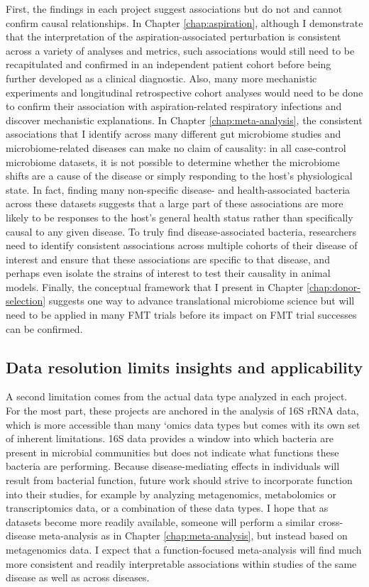 First, the findings in each project suggest associations but do not and cannot confirm causal relationships.
In Chapter \ref{chap:aspiration}, although I demonstrate that the interpretation of the aspiration-associated perturbation is consistent across a variety of analyses and metrics, such associations would still need to be recapitulated and confirmed in an independent patient cohort before being further developed as a clinical diagnostic.
Also, many more mechanistic experiments and longitudinal retrospective cohort analyses would need to be done to confirm their association with aspiration-related respiratory infections and discover mechanistic explanations.
In Chapter \ref{chap:meta-analysis}, the consistent associations that I identify across many different gut microbiome studies and microbiome-related diseases can make no claim of causality: in all case-control microbiome datasets, it is not possible to determine whether the microbiome shifts are a cause of the disease or simply responding to the host's physiological state.
In fact, finding many non-specific disease- and health-associated bacteria across these datasets suggests that a large part of these associations are more likely to be responses to the host's general health status rather than specifically causal to any given disease.
To truly find disease-associated bacteria, researchers need to identify consistent associations across multiple cohorts of their disease of interest and ensure that these associations are specific to that disease, and perhaps even isolate the strains of interest to test their causality in animal models.
Finally, the conceptual framework that I present in Chapter \ref{chap:donor-selection} suggests one way to advance translational microbiome science but will need to be applied in many FMT trials before its impact on FMT trial successes can be confirmed.

\subsection{Data resolution limits insights and applicability}

A second limitation comes from the actual data type analyzed in each project.
For the most part, these projects are anchored in the analysis of 16S rRNA data, which is more accessible than many `omics data types but comes with its own set of inherent limitations.
16S data provides a window into which bacteria are present in microbial communities but does not indicate what functions these bacteria are performing.
Because disease-mediating effects in individuals will result from bacterial function, future work should strive to incorporate function into their studies, for example by analyzing metagenomics, metabolomics or transcriptomics data, or a combination of these data types.
I hope that as datasets become more readily available,  someone will perform a similar cross-disease meta-analysis as in Chapter \ref{chap:meta-analysis}, but instead based on metagenomics data.
I expect that a function-focused meta-analysis will find much more consistent and readily interpretable associations within studies of the same disease as well as across diseases.

